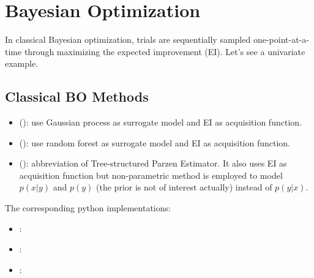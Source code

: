 \documentclass[letterpaper,10pt,english]{sphinxmanual}
\begin{document}
\section{Bayesian Optimization}
\label{\detokenize{pybayopt:bayesian-optimization}}\label{\detokenize{pybayopt::doc}}
In classical Bayesian optimization, trials are sequentially sampled one-point-at-a-time through
maximizing the expected improvement (EI). Let’s see a univariate example.



\subsection{Classical BO Methods}
\label{\detokenize{pybayopt:classical-bo-methods}}\begin{itemize}
\item {} 
 (): use Gaussian process as surrogate model and EI as acquisition function.

\item {} 
 (): use random forest as surrogate model and EI as acquisition function.

\item {} 
 (): abbreviation of Tree-structured Parzen Estimator. It also uses EI as acquisition function but non-parametric method is employed to model \(p(x|y)\) and \(p(y)\) (the prior is not of interest actually) instead of \(p(y|x)\).

\end{itemize}

The corresponding python implementations:
\begin{itemize}
\item {} 
: 

\item {} 
: 

\item {} 
: 

\end{itemize}
\end{document}
